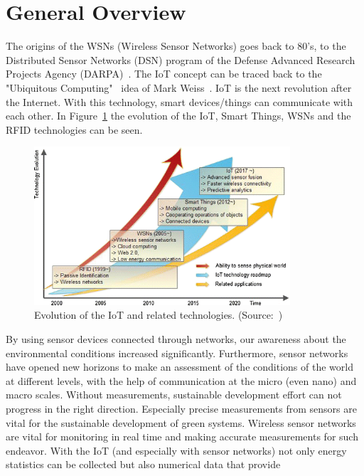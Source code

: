 \documentclass[12pt, oneandhalf, chaparabic, sees, ms]{metu}
\begin{document}
\section{General Overview}\label{sgeneral}
The origins of the WSNs (Wireless Sensor Networks) goes back to 80's, to the Distributed Sensor Networks (DSN) program of the Defense Advanced Research
Projects Agency (DARPA)~\cite{jindal2018}. The IoT concept can be traced back to the "Ubiquitous Computing"~\cite{weiser1991} idea of Mark Weiss~\cite{aelita2012}.
IoT is the next revolution after the Internet. With this
technology, smart devices/things can communicate with
each other. In Figure~\ref{fig:iot-trend} the evolution of the IoT, Smart Things, WSNs and the RFID technologies can be seen. 
%
\begin{figure}[!htbp]
 \begin{center}
  \includegraphics[width=0.85\textwidth]{iot-trend.png}
 \end{center}
 \caption{Evolution of the IoT and related technologies. (Source:~\protect\cite{li2015}) }
  \label{fig:iot-trend}
\end{figure}
%
By using sensor devices connected through networks, our awareness about the environmental conditions
increased significantly. Furthermore, sensor networks have opened
new horizons to make an assessment of the conditions of the
world at different levels, with the help of communication at the micro (even nano) and macro scales.
Without measurements, sustainable development effort can not progress in the right direction.
Especially precise measurements
from sensors are vital for the sustainable development of green systems. 
Wireless sensor networks are vital for monitoring in real time and making accurate measurements for such endeavor.
With the IoT (and especially
with sensor networks) not only energy statistics
can be collected but also numerical data that provide
\end{document}
